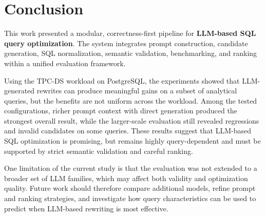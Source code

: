 
\section{Conclusion}
\label{sec:conclusion}

This work presented a modular, correctness-first pipeline for \textbf{LLM-based SQL query optimization}. The system integrates prompt construction, candidate generation, SQL normalization, semantic validation, benchmarking, and ranking within a unified evaluation framework.

Using the TPC-DS workload on PostgreSQL, the experiments showed that LLM-generated rewrites can produce meaningful gains on a subset of analytical queries, but the benefits are not uniform across the workload. Among the tested configurations, richer prompt context with direct generation produced the strongest overall result, while the larger-scale evaluation still revealed regressions and invalid candidates on some queries. These results suggest that LLM-based SQL optimization is promising, but remains highly query-dependent and must be supported by strict semantic validation and careful ranking.

One limitation of the current study is that the evaluation was not extended to a broader set of LLM families, which may affect both validity and optimization quality. Future work should therefore compare additional models, refine prompt and ranking strategies, and investigate how query characteristics can be used to predict when LLM-based rewriting is most effective.
